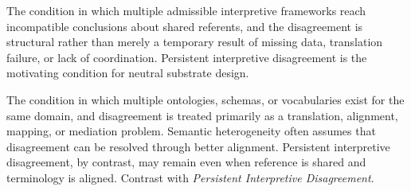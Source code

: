 \begin{description}[style=nextline,leftmargin=1.5cm]

\item[Persistent Interpretive Disagreement]
The condition in which multiple admissible interpretive frameworks
reach incompatible conclusions about shared referents,
and the disagreement is structural rather than merely
a temporary result of missing data, translation failure,
or lack of coordination.
Persistent interpretive disagreement is the motivating condition
for neutral substrate design.

\item[Semantic Heterogeneity]
The condition in which multiple ontologies,
schemas, or vocabularies exist for the same domain,
and disagreement is treated primarily as a translation,
alignment, mapping, or mediation problem.
Semantic heterogeneity often assumes that disagreement
can be resolved through better alignment.
Persistent interpretive disagreement, by contrast,
may remain even when reference is shared
and terminology is aligned.
Contrast with \emph{Persistent Interpretive Disagreement}.

\end{description}
